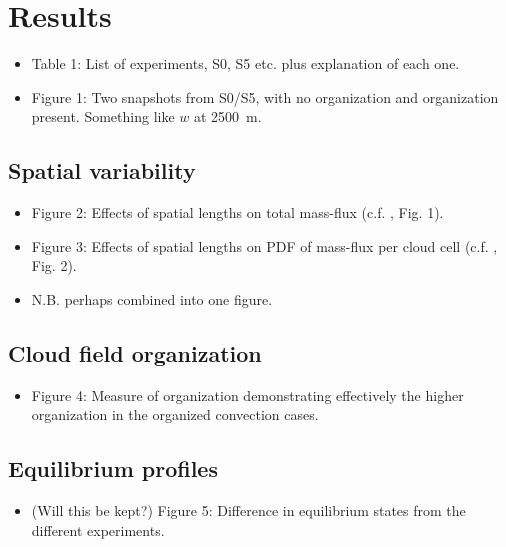 \documentclass[11pt,a4paper]{article}
\newcommand*\mean[1]{\overline{#1}}
\begin{document}

\section{Results}
\begin{itemize}
   \item Table 1: List of experiments, S0, S5 etc. plus explanation of each one.

   \item Figure 1: Two snapshots from S0/S5, with no organization and organization present. Something like $w$ at \SI{2500}{m}.
\end{itemize}

\subsection{Spatial variability}
\begin{itemize}
    \item Figure 2: Effects of spatial lengths on total mass-flux (c.f. \cite{PC2008}, Fig. 1).
    \item Figure 3: Effects of spatial lengths on PDF of mass-flux per cloud cell (c.f. \cite{CC2006II}, Fig. 2).
    \item N.B. perhaps combined into one figure.
\end{itemize}

\subsection{Cloud field organization}
\begin{itemize}
    \item Figure 4: Measure of organization demonstrating effectively the higher organization in the organized convection cases.
\end{itemize}

\subsection{Equilibrium profiles}
\begin{itemize}
    \item (Will this be kept?) Figure 5: Difference in equilibrium states from the different experiments. 
\end{itemize}
\end{document}
